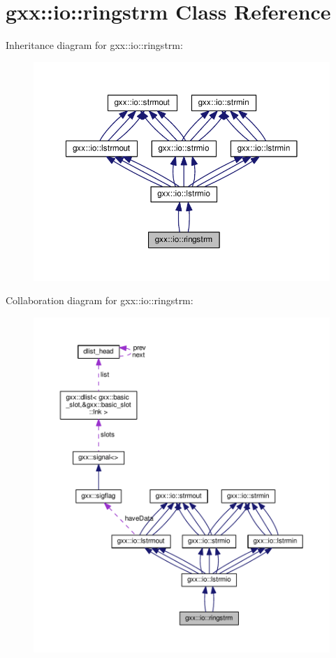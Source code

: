 \hypertarget{classgxx_1_1io_1_1ringstrm}{}\section{gxx\+:\+:io\+:\+:ringstrm Class Reference}
\label{classgxx_1_1io_1_1ringstrm}


Inheritance diagram for gxx\+:\+:io\+:\+:ringstrm\+:
\nopagebreak
\begin{figure}[H]
\begin{center}
\leavevmode
\includegraphics[width=350pt]{classgxx_1_1io_1_1ringstrm__inherit__graph}
\end{center}
\end{figure}


Collaboration diagram for gxx\+:\+:io\+:\+:ringstrm\+:
\nopagebreak
\begin{figure}[H]
\begin{center}
\leavevmode
\includegraphics[width=350pt]{classgxx_1_1io_1_1ringstrm__coll__graph}
\end{center}
\end{figure}
